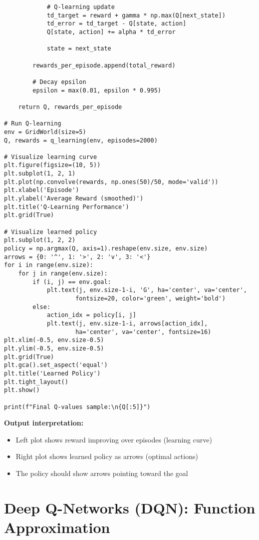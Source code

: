 \begin{codebox}
\begin{lstlisting}
            # Q-learning update
            td_target = reward + gamma * np.max(Q[next_state])
            td_error = td_target - Q[state, action]
            Q[state, action] += alpha * td_error
            
            state = next_state
        
        rewards_per_episode.append(total_reward)
        
        # Decay epsilon
        epsilon = max(0.01, epsilon * 0.995)
    
    return Q, rewards_per_episode

# Run Q-learning
env = GridWorld(size=5)
Q, rewards = q_learning(env, episodes=2000)

# Visualize learning curve
plt.figure(figsize=(10, 5))
plt.subplot(1, 2, 1)
plt.plot(np.convolve(rewards, np.ones(50)/50, mode='valid'))
plt.xlabel('Episode')
plt.ylabel('Average Reward (smoothed)')
plt.title('Q-Learning Performance')
plt.grid(True)

# Visualize learned policy
plt.subplot(1, 2, 2)
policy = np.argmax(Q, axis=1).reshape(env.size, env.size)
arrows = {0: '^', 1: '>', 2: 'v', 3: '<'}
for i in range(env.size):
    for j in range(env.size):
        if (i, j) == env.goal:
            plt.text(j, env.size-1-i, 'G', ha='center', va='center', 
                    fontsize=20, color='green', weight='bold')
        else:
            action_idx = policy[i, j]
            plt.text(j, env.size-1-i, arrows[action_idx], 
                    ha='center', va='center', fontsize=16)
plt.xlim(-0.5, env.size-0.5)
plt.ylim(-0.5, env.size-0.5)
plt.grid(True)
plt.gca().set_aspect('equal')
plt.title('Learned Policy')
plt.tight_layout()
plt.show()

print(f"Final Q-values sample:\n{Q[:5]}")
\end{lstlisting}

\textbf{Output interpretation:}
\begin{itemize}
    \item Left plot shows reward improving over episodes (learning curve)
    \item Right plot shows learned policy as arrows (optimal actions)
    \item The policy should show arrows pointing toward the goal
\end{itemize}
\end{codebox}

\section{Deep Q-Networks (DQN): Function Approximation}

